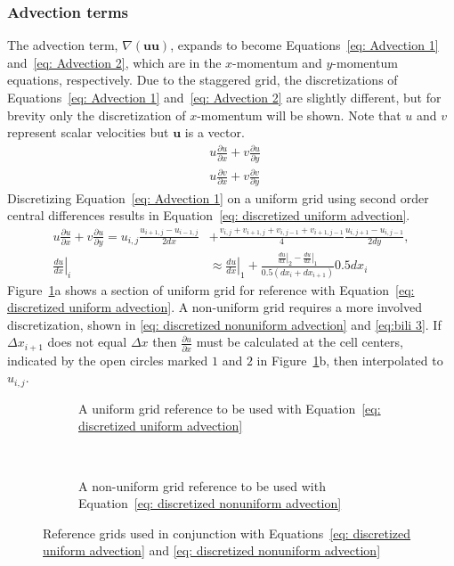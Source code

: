 \subsubsection{Advection terms}
\label{sed:ID NS Advection}
The advection term, $\nabla (\textbf{uu})$, expands to become Equations~\eqref{eq: Advection 1} and~\eqref{eq: Advection 2}, which are in the $x$-momentum and $y$-momentum equations, respectively. 
Due to the staggered grid, the discretizations of Equations~\eqref{eq: Advection 1} and~\eqref{eq: Advection 2} are slightly different, but for brevity only the discretization of $x$-momentum will be shown. 
Note that $u$ and $v$ represent scalar velocities but $\textbf{u}$ is a vector. 
\begin{align}
&u\frac{\partial u}{\partial x} + v\frac{\partial u}{\partial y} \label{eq: Advection 1} \\ 
&u\frac{\partial v}{\partial x} + v\frac{\partial v}{\partial y} \; \label{eq: Advection 2}
\end{align}
Discretizing Equation~\eqref{eq: Advection 1} on a uniform grid using second order central differences results in Equation~\eqref{eq: discretized uniform advection}. 
\begin{align}
u\frac{\partial u}{\partial x} + v\frac{\partial u}{\partial y} = u_{i,j}\frac{u_{i+1,j} - u_{i-1,j}}{2dx} &+ \frac{v_{i,j} + v_{i+1,j} + v_{i,j-1} + v_{i+1,j-1}}{4}\frac{u_{i,j+1} - u_{i,j-1}}{2dy}, \label{eq: discretized uniform advection}\\
\left.\frac{du}{dx}\right|_i&\approx\left.\frac{du}{dx}\right|_1 + \frac{\left.\frac{du}{dx}\right|_2 - \left.\frac{du}{dx}\right|_1}{0.5(dx_i + dx_{i+1})}0.5dx_i\; \label{eq: discretized nonuniform advection} 
\end{align}
Figure~\ref{fig:discretized uniform advection}a shows a section of uniform grid for reference with Equation~\eqref{eq: discretized uniform advection}. 
A non-uniform grid requires a more involved discretization, shown in \eqref{eq: discretized nonuniform advection} and \eqref{eq:bili 3}. 
If $\Delta x_{i+1}$ does not equal $\Delta x$ then $\frac{\partial u}{\partial x}$ must be calculated at the cell centers, indicated by the open circles marked $1$ and $2$ in Figure~\ref{fig:discretized uniform advection}b, then interpolated to $u_{i,j}$. 

\begin{figure}[!htb]
	\centering
	\begin{subfigure}{0.4\textwidth}
		
		\caption{A uniform grid reference to be used with Equation~\eqref{eq: discretized uniform advection}}
	\end{subfigure}
	~
	\begin{subfigure}{0.4\textwidth}
		
		\caption{A non-uniform grid reference to be used with Equation~\eqref{eq: discretized nonuniform advection}}
	\end{subfigure}
	\caption{Reference grids used in conjunction with Equations~\eqref{eq: discretized uniform advection} and \eqref{eq: discretized nonuniform advection}}
	\label{fig:discretized uniform advection}
\end{figure}

